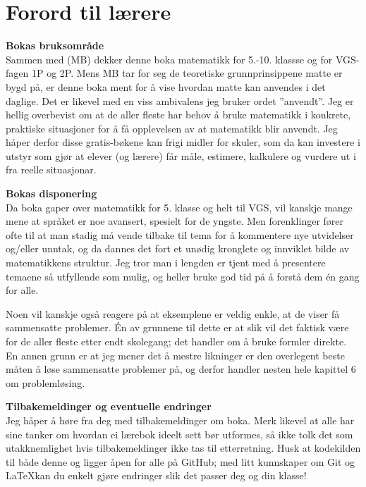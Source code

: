 


\newpage
\section*{Forord til lærere}
\textbf{Bokas bruksområde}\\
Sammen med  (MB) dekker denne boka matematikk for 5.-10. klassse og for VGS-fagen 1P og 2P. Mens MB tar for seg de teoretiske grunnprinsippene matte er bygd på, er denne boka ment for å vise hvordan matte kan anvendes i det daglige. Det er likevel med en viss ambivalens jeg bruker ordet ''anvendt''. Jeg er hellig overbevist om at de aller fleste har behov å bruke matematikk i konkrete, praktiske situasjoner for å få opplevelsen av at matematikk blir anvendt. Jeg håper derfor disse gratis-bøkene kan frigi midler for skuler, som da kan investere i utstyr som gjør at elever (og lærere) får måle, estimere, kalkulere og vurdere ut i fra reelle situasjonar.\vsk

\textbf{Bokas disponering} \\
Da boka gaper over matematikk for 5. klasse og helt til VGS, vil kanskje mange mene at språket er noe avansert, spesielt for de yngste. Men forenklinger fører ofte til at man stadig må vende tilbake til tema for å kommentere nye utvidelser og/eller unntak, og da dannes det fort et unødig kronglete og innviklet bilde av matematikkens struktur. Jeg tror man i lengden er tjent med å presentere temaene så utfyllende som mulig, og heller bruke god tid på å forstå dem én gang for alle.\vsk

Noen vil kanskje også reagere på at eksemplene er veldig enkle, at de viser få sammensatte problemer. Én av grunnene til dette er at slik vil det faktisk være for de aller fleste etter endt skolegang; det handler om å bruke formler direkte. En annen grunn er at jeg mener det å mestre likninger er den overlegent beste måten å løse sammensatte problemer på, og derfor handler nesten hele kapittel 6 om problemløsing.\vsk

\textbf{Tilbakemeldinger og eventuelle endringer} \\
Jeg håper å høre fra deg med tilbakemeldinger om boka. Merk likevel at alle har sine tanker om hvordan ei lærebok ideelt sett bør utformes, så ikke tolk det som utakknemlighet hvis tilbakemeldinger ikke tas til etterretning. Husk at kodekilden til både denne  og \mb\;ligger åpen for alle på GitHub; med litt kunnskaper om Git og \LaTeX\;kan du enkelt gjøre endringer slik det passer deg og din klasse!


